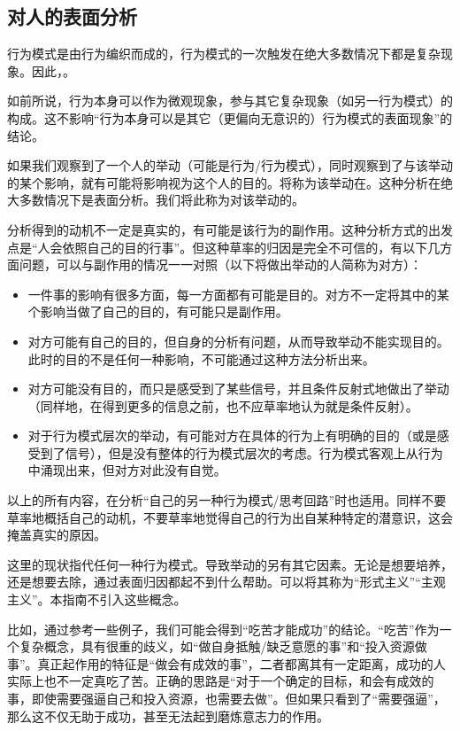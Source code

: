 \subsection{对人的表面分析}
行为模式是由行为编织而成的，行为模式的一次触发在绝大多数情况下都是复杂现象。因此，。
\begin{examples}
如前所说，行为本身可以作为微观现象，参与其它复杂现象（如另一行为模式）的构成。这不影响“行为本身可以是其它（更偏向无意识的）行为模式的表面现象”的结论。
\end{examples}
如果我们观察到了一个人的举动（可能是行为/行为模式），同时观察到了与该举动的某个影响，就有可能将影响视为这个人的目的。将称为该举动在。这种分析在绝大多数情况下是表面分析。我们将此称为对该举动的。
\begin{explain}
分析得到的动机不一定是真实的，有可能是该行为的副作用。这种分析方式的出发点是“人会依照自己的目的行事”。但这种草率的归因是完全不可信的，有以下几方面问题，可以与副作用的情况一一对照（以下将做出举动的人简称为对方）：
\begin{itemize}
\item 一件事的影响有很多方面，每一方面都有可能是目的。对方不一定将其中的某个影响当做了自己的目的，有可能只是副作用。
\item 对方可能有自己的目的，但自身的分析有问题，从而导致举动不能实现目的。此时的目的不是任何一种影响，不可能通过这种方法分析出来。
\item 对方可能没有目的，而只是感受到了某些信号，并且条件反射式地做出了举动（同样地，在得到更多的信息之前，也不应草率地认为就是条件反射）。
\item 对于行为模式层次的举动，有可能对方在具体的行为上有明确的目的（或是感受到了信号），但是没有整体的行为模式层次的考虑。行为模式客观上从行为中涌现出来，但对方对此没有自觉。
\end{itemize}
以上的所有内容，在分析“自己的另一种行为模式/思考回路”时也适用。同样不要草率地概括自己的动机，不要草率地觉得自己的行为出自某种特定的潜意识，这会掩盖真实的原因。
\end{explain}
\begin{examples}
这里的现状指代任何一种行为模式。导致举动的另有其它因素。无论是想要培养，还是想要去除，通过表面归因都起不到什么帮助。\trained 可以将其称为“形式主义”“主观主义”。本指南不引入这些概念。

比如，通过参考一些例子，我们可能会得到“吃苦才能成功”的结论。“吃苦”作为一个复杂概念，具有很重的歧义，如“做自身抵触/缺乏意愿的事”和“投入资源做事”。真正起作用的特征是“做会有成效的事”，二者都离其有一定距离，成功的人实际上也不一定真吃了苦。正确的思路是“对于一个确定的目标，和会有成效的事，即使需要强逼自己和投入资源，也需要去做”。但如果只看到了“需要强逼”，那么这不仅无助于成功，甚至无法起到磨炼意志力的作用。
\end{examples}

